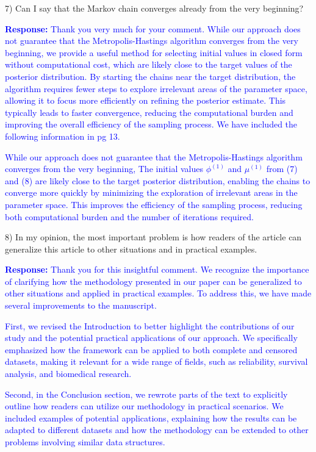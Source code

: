 \documentclass[12pt]{article}
\begin{document}
7) Can I say that the Markov chain converges already from the very beginning?

\textcolor{blue}{\textbf{Response:}  Thank you very much for your comment. While our approach does not guarantee that the Metropolis-Hastings algorithm converges from the very beginning, we provide a useful method for selecting initial values in closed form without computational cost, which are likely close to the target values of the posterior distribution. By starting the chains near the target distribution, the algorithm requires fewer steps to explore irrelevant areas of the parameter space, allowing it to focus more efficiently on refining the posterior estimate. This typically leads to faster convergence, reducing the computational burden and improving the overall efficiency of the sampling process. We have included the following information in pg 13.}

\textcolor{blue}{While our approach does not guarantee that the Metropolis-Hastings algorithm converges from the very beginning, The initial values  $\phi^{(1)}$ and $\mu^{(1)}$ from (7) and (8) are likely close to the target posterior distribution, enabling the chains to converge more quickly by minimizing the exploration of irrelevant areas in the parameter space. This improves the efficiency of the sampling process, reducing both computational burden and the number of iterations required.}



8) In my opinion, the most important problem is how readers of the article can generalize this article to other situations and in practical examples.

\textcolor{blue}{\textbf{Response:} Thank you for this insightful comment. We recognize the importance of clarifying how the methodology presented in our paper can be generalized to other situations and applied in practical examples. To address this, we have made several improvements to the manuscript.}

\textcolor{blue}{First, we revised the Introduction to better highlight the contributions of our study and the potential practical applications of our approach. We specifically emphasized how the framework can be applied to both complete and censored datasets, making it relevant for a wide range of fields, such as reliability, survival analysis, and biomedical research.}

\textcolor{blue}{Second, in the Conclusion section, we rewrote parts of the text to explicitly outline how readers can utilize our methodology in practical scenarios. We included examples of potential applications, explaining how the results can be adapted to different datasets and how the methodology can be extended to other problems involving similar data structures.}
\end{document}
